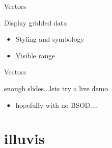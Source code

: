 \begin{frame}{Vectors}
	\begin{block}{Display gridded data}
		\begin{itemize}
			\item Styling and symbology
			\item Visible range
		\end{itemize}
		
	\end{block}


\end{frame}


\begin{frame}{Vectors}
	\begin{block}{enough slides...lets try a live demo}
				\begin{itemize}
					\item hopefully with no BSOD....
				\end{itemize}
	\end{block}	
\end{frame}

\section{illuvis}